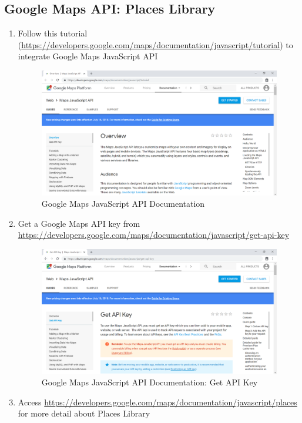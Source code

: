 \tocless\subsection{Google Maps API: Places Library}
\begin{enumerate}
	\item Follow this tutorial (\href{https://developers.google.com/maps/documentation/javascript/tutorial}{https://developers.google.com/maps/documentation/javascript/tutorial}) to integrate Google Maps JavaScript API
	      \begin{center}
	      	\begin{figure}[H]
	      		\centering
	      		\includegraphics[width=0.6\columnwidth]{images/appendixA/Google-Maps-Tutorial.PNG}
	      		\caption{Google Maps JavaScript API Documentation}
	      	\end{figure}
	      \end{center}
	\item Get a Google Maps API key from \href{https://developers.google.com/maps/documentation/javascript/get-api-key}{https://developers.google.com/maps/documentation/javascript/get-api-key}
	      \begin{center}
	      	\begin{figure}[H]
	      		\centering
	      		\includegraphics[width=0.6\columnwidth]{images/appendixA/Google-Maps-API-Keys.PNG}
	      		\caption{Google Maps JavaScript API Documentation: Get API Key}
	      	\end{figure}
	      \end{center}
	\item Access \href{https://developers.google.com/maps/documentation/javascript/places}{https://developers.google.com/maps/documentation/javascript/places} for more detail about Places Library

\end{enumerate}

